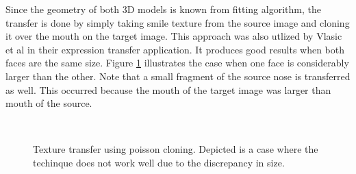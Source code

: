 \documentclass[11pt,a4paper,twoside]{report}
\begin{document}
Since the geometry of both 3D models is known from fitting algorithm, the
transfer is done by simply taking smile texture from the source image and cloning it
over the mouth on the target image. This approach was also utlized by Vlasic et
al \cite{faceTransfer05} in their expression transfer application. It produces
good results when both faces are the same size. Figure \ref{poisson3}
illustrates the case when one face is considerably larger than the other. Note
that a small fragment of the source nose is transferred as well. This occurred because the mouth of
the target image was larger than mouth of the source.

\begin{figure}[H]
\centering
{}\\
\caption{Texture transfer using poisson cloning. Depicted is a case where the
  techinque does not work well due to the discrepancy in size.}\label{poisson3}
\end{figure}
\end{document}
